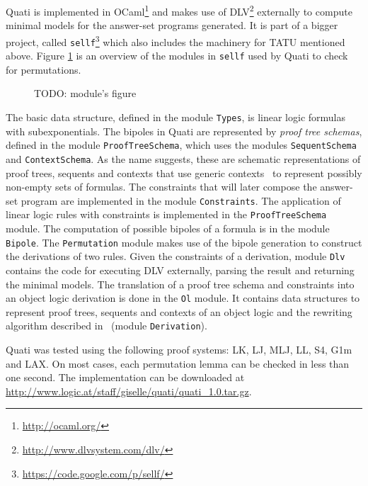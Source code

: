 \documentclass{llncs}
\begin{document}
Quati is implemented in OCaml\footnote{\url{http://ocaml.org/}} and makes use of
DLV\footnote{\url{http://www.dlvsystem.com/dlv/}} externally to compute minimal models for the
answer-set programs generated. It is part of a bigger project, called
\texttt{sellf}\footnote{\url{https://code.google.com/p/sellf/}} which also includes the
machinery for TATU mentioned above. Figure \ref{fig:modules} is an overview of
the modules in \texttt{sellf} used by Quati to check for permutations.

\begin{figure}
TODO: module's figure
\caption{}
\label{fig:modules}
\end{figure}

The basic data structure, defined in the module \texttt{Types}, is linear logic
formulas with subexponentials. The bipoles in Quati are represented by
\emph{proof tree schemas}, defined in the module \texttt{ProofTreeSchema}, which
uses the modules \texttt{SequentSchema} and \texttt{ContextSchema}. As the name
suggests, these are schematic representations of proof trees, sequents and
contexts that use generic contexts~\cite{nigam13iclp} to represent possibly
non-empty sets of formulas. 
The constraints that will
later compose the answer-set program are implemented in the module \texttt{Constraints}.
The application of linear logic rules with constraints is implemented in the
\texttt{ProofTreeSchema} module.
%
The computation of possible bipoles of a formula is in the module
\texttt{Bipole}. The \texttt{Permutation} module makes use of the bipole
generation to construct the derivations of two rules. Given the
constraints of a derivation, module \texttt{Dlv} contains the code
for executing DLV externally, parsing the result and returning the minimal
models. 
%
The translation of a proof tree schema and constraints into an object logic
derivation is done in the \texttt{Ol} module. It contains data structures to
represent proof trees, sequents and contexts of an object logic and the
rewriting algorithm described in~\cite{nigam13iclp} (module \texttt{Derivation}).

Quati was tested using the following proof systems: LK, LJ, MLJ, LL, S4, G1m and
LAX. On
most cases, each permutation lemma can be checked in less than one second. The
implementation can be downloaded at
\url{http://www.logic.at/staff/giselle/quati/quati\_1.0.tar.gz}.
\end{document}

